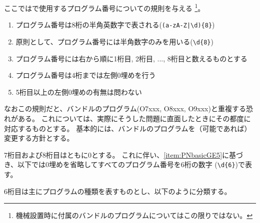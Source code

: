 


ここでは\DMname で使用するプログラム番号についての規則を与える
\footnote{機械設置時に付属のバンドルのプログラムについてはこの限りではない。}。



\begin{enumerate}[label=\Roman*), ref=\Roman*)]
\item プログラム番号は8桁の半角英数字で表される(\verb+(a-zA-Z|\d){8}+)
\item 原則として、プログラム番号には半角数字のみを用いる(\verb|\d{8}|)
\item プログラム番号には右から順に1桁目, 2桁目, ..., 8桁目と数えるものとする
\item プログラム番号は4桁までは左側0埋めを行う
\item\label{item:PNbasicGE5} 5桁目以上の左側0埋めの有無は問わない
\end{enumerate}
\begin{hosoku}
なおこの規則だと、バンドルのプログラム(O7xxx, O8xxx, O9xxx)と重複する恐れがある。
これについては、実際にそうした問題に直面したときにその都度に対応するものとする。
基本的には、バンドルのプログラムを（可能であれば）変更する方針とする。
\end{hosoku}


7桁目および8桁目はともに0とする。
これに伴い、\ref{item:PNbasicGE5}に基づき、以下では0埋めを省略してすべてのプログラム番号を6桁の数字 (\verb|\d{6}|)で表す。


\clearpage
6桁目は主にプログラムの種類を表すものとし、以下のように分類する。

